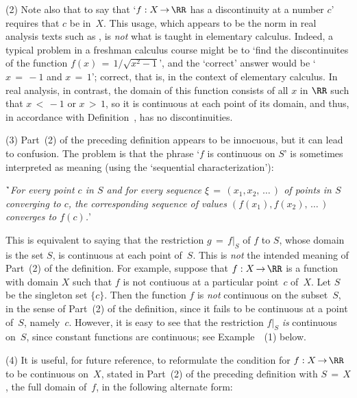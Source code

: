 \V

        (2) Note also that to say that `$f:X \,{\rightarrow}\, {\RR}$ has a discontinuity at a number $c$' requires that $c$ be in~$X$.
    This usage, which appears to be the norm in real analysis texts such as {\ThisText}, is {\em not} what is taught in elementary calculus.
    Indeed, a typical problem in a freshman calculus course might be to `find the discontinuites of the function $f(x) \,=\, 1/\sqrt{x^{2}-1}$',
    and the `correct' answer would be `$x \,=\, -1$ and $x \,=\, 1$'; correct, that is, in the context of elementary calculus.
    In real analysis, in contrast, the domain of this function consists of all $x$ in ${\RR}$ such that $x\,<\,-1$ or $x\,>\,1$,
    so it is continuous at each point of its domain, and thus, in accordance with Definition~, has no discontinuities.

\V

        (3) Part~(2) of the preceding definition appears to be innocuous, but it can lead to confusion.
    The problem is that the phrase `$f$ is continuous on $S$' is sometimes interpreted as meaning (using the `sequential characterization'):

\VA

    \h `{\em For every point $c$ in $S$ and for every sequence ${\xi} \,=\, (x_{1},x_{2},\,{\ldots}\,)$ of points {\em in $S$} converging to $c$,
    the corresponding sequence of values $(f(x_{1}),f(x_{2}),\,{\ldots}\,)$ converges to $f(c)$.}'

\VA

\hspace*{\parindent}This is equivalent to saying that the restriction $g \,=\, f|_{S}$ of $f$ to $S$, whose domain is the set $S$, is continuous at each point of~$S$.
    This is {\em not} the intended meaning of Part~(2) of the definition. For example, suppose that $f:X \,{\rightarrow}\, {\RR}$
    is a function with domain $X$ such that $f$ is not contiuous at a particular point~$c$ of~$X$. Let $S$ be the singleton set $\{c\}$.
    Then the function $f$ is {\em not} continuous on the subset~$S$, in the sense of Part~(2) of the definition,
    since it fails to be continuous at a point of~$S$, namely~$c$. However, it is easy to see that the restriction $f|_{S}$
    {\em is} continuous on~$S$, since constant functions are continuous; see Example~~(1) below.

\V

        (4) It is useful, for future reference, to reformulate the condition for $f:X \,{\rightarrow}\,{\RR}$ to be continuous on~$X$,
    stated in Part~(2) of the preceding definition with $S \,=\, X$, the full domain of~$f$, in the following alternate form:

